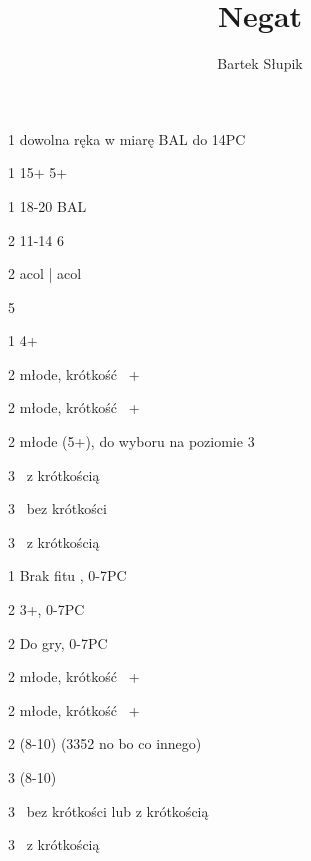 \documentclass[12pt, a4paper]{article}
\title{\vspace{-2cm}Negat}
\date{}
\author{Bartek Słupik}
\begin{document}
\maketitle

\sequence{{1\clubs}{1\diams}}
\begin{options}[1]
    \item[1\hearts] dowolna ręka w miarę BAL do 14PC \vimp
    \item[1\spades] 15+ 5+\clubs \vimp
    \item[1\nt] 18-20 BAL
    \item[2\clubs] 11-14 6\clubs  
    \item[2\diams] acol \clubs | acol \clubs\diams \imp
\end{options}

\sequence{{1\clubs}{1\diams}{1\hearts}}
\begin{options}[2]
    \item[\pass] 5\hearts
    \item[1\spades] 4+\spades 
    \item[2\hearts] młode, krótkość \hearts\ \inv+
    \item[2\spades] młode, krótkość \spades\ \inv+
    \item[2\nt] młode (5+\clubs), do wyboru na poziomie 3
    \item[3\clubs] \gf\ \diams z krótkością \clubs
    \item[3\diams] \gf\ \diams bez krótkości
    \item[3\major] \gf\ \diams z krótkością   
\end{options}

\sequence{{1\clubs}{1\diams}{1\spades}}
\begin{options}[2]
    \item[1\nt] Brak fitu \clubs, 0-7PC
    \item[2\clubs] 3+\clubs, 0-7PC
    \item[2\diams] Do gry, 0-7PC
    \item[2\hearts] młode, krótkość \hearts\ \inv+
    \item[2\spades] młode, krótkość \spades\ \inv+
    \item[2\nt] \inv (8-10) (3352 no bo co innego)
    \item[3\clubs] \inv (8-10)  
    \item[3\diams] \gf\ \diams bez krótkości lub z krótkością \clubs
    \item[3\major] \gf\ \diams z krótkością 
\end{options}
\end{document}

